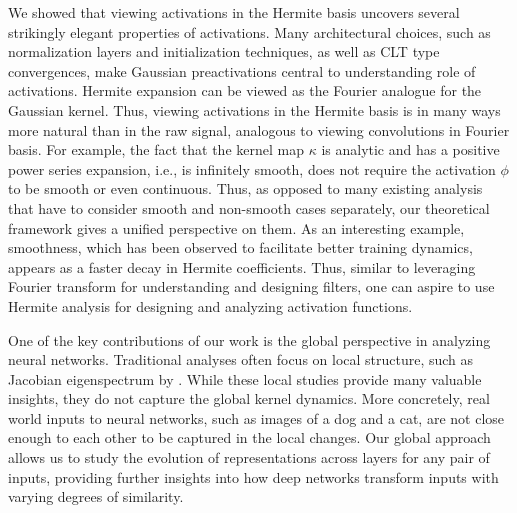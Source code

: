 \documentclass[twoside]{article}
\theoremstyle{definition}
\begin{document}
We showed that viewing activations in the Hermite basis uncovers several strikingly elegant properties of activations. Many architectural choices, such as normalization layers and initialization techniques, as well as CLT type convergences, make Gaussian preactivations central to understanding role of activations. Hermite expansion can be viewed as the Fourier analogue for the Gaussian kernel. Thus, viewing activations in the Hermite basis is in many ways more natural than in the raw signal, analogous to viewing convolutions in Fourier basis. For example, the fact that the kernel map $\kappa$ is analytic and has a positive power series expansion, i.e., is infinitely smooth, does not require the activation $\phi$ to be smooth or even continuous. Thus, as opposed to many existing analysis that have to consider smooth and non-smooth cases separately, our theoretical framework gives a unified perspective on them. As an interesting example, smoothness, which has been observed to facilitate better training dynamics\citep{hayou2019impact}, appears as a faster decay in Hermite coefficients.  Thus, similar to leveraging Fourier transform for understanding and designing filters, one can aspire to use Hermite analysis for designing and analyzing activation functions.


One of the key contributions of our work is the global perspective in analyzing neural networks. Traditional analyses often focus on local structure, such as Jacobian eigenspectrum by \citet{pennington2018emergence}. While these local studies provide many  valuable insights, they do not capture the global kernel dynamics. More concretely, real world inputs to neural networks, such as images of a dog and a cat, are not close enough to each other to be captured in the local changes. Our global approach allows us to study the evolution of representations across layers for any pair of inputs, providing further insights into how deep networks transform inputs with varying degrees of similarity.
\end{document}
